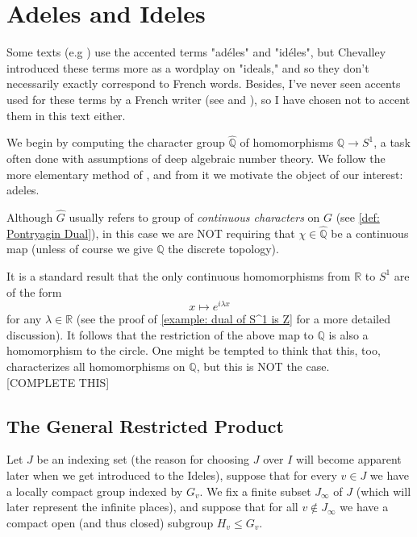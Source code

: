 \documentclass[11pt, x11names, openany]{book}
\newcommand{\qq}{\mathbb{Q}}
\newcommand{\rr}{\mathbb{R}}
\renewcommand{\hat}{\widehat}
\begin{document}
\section{Adeles and Ideles}
\label{section: Adeles&Ideles}


\begin{remark}
    Some texts (e.g \cite{bernstein2013introduction}) use the accented terms "ad\'eles" and "id\'eles", but Chevalley introduced these terms more as a wordplay on "ideals," and so they don't necessarily exactly correspond to French words. Besides, I've never seen accents used for these terms by a French writer (see \cite{weil1974basic} and \cite{lang1994algebraic}), so I have chosen not to accent them in this text either.
\end{remark}

We begin by computing the character group $\hat{\qq}$ of homomorphisms $\qq \to S^1$, a task often done with assumptions of deep algebraic number theory. We follow the more elementary method of \cite{CharGroupOfQ}, and from it we motivate the object of our interest: adeles.
\begin{warning}
    Although $\hat{G}$ usually refers to group of \textit{continuous characters} on $G$ (see \ref{def: Pontryagin Dual}), in this case we are NOT requiring that $\chi \in \hat{\qq}$ be a continuous map (unless of course we give $\qq$ the discrete topology).
\end{warning}
It is a standard result that the only continuous homomorphisms from $\rr$ to $S^1$ are of the form
\begin{equation*}
    x \mapsto e^{i \lambda x}
\end{equation*}
for any $\lambda \in \rr$ (see the proof of \ref{example: dual of S^1 is Z} for a more detailed discussion). It follows that the restriction of the above map to $\qq$ is also a homomorphism to the circle. One might be tempted to think that this, too, characterizes all homomorphisms on $\qq$, but this is NOT the case.\\

[COMPLETE THIS]

\subsection{The General Restricted Product}
\label{subsection: Restricted Products}

Let $J$ be an indexing set (the reason for choosing $J$ over $I$ will become apparent
later when we get introduced to the Ideles), suppose that for every $v \in J$ we have 
a locally compact group indexed by $G_v$. We fix a finite subset $J_\infty$ of $J$ (which
will later represent the infinite places), and suppose that for all $v \notin J_\infty$
we have a compact open (and thus closed) subgroup $H_v \leq G_v$.
\end{document}
